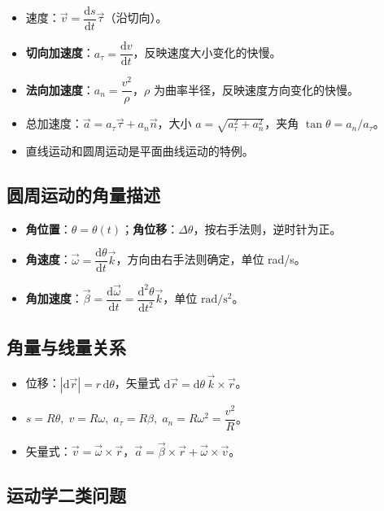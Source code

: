 \documentclass[12pt,a4paper]{ctexart}
\begin{document}
\begin{itemize}
    \item 速度：$\vec{v} = \dfrac{\mathrm{d}s}{\mathrm{d}t}\vec{\tau}$（沿切向）。
    \item \textbf{切向加速度}：$a_\tau = \dfrac{\mathrm{d}v}{\mathrm{d}t}$，反映速度大小变化的快慢。
    \item \textbf{法向加速度}：$a_n = \dfrac{v^2}{\rho}$，$\rho$ 为曲率半径，反映速度方向变化的快慢。
    \item 总加速度：$\vec{a} = a_\tau\vec{\tau} + a_n\vec{n}$，大小 $a = \sqrt{a_\tau^2 + a_n^2}$，夹角 $\tan\theta = a_n/a_\tau$。
    \item 直线运动和圆周运动是平面曲线运动的特例。
\end{itemize}

\subsection{圆周运动的角量描述}

\begin{itemize}
    \item \textbf{角位置}：$\theta = \theta(t)$；\textbf{角位移}：$\Delta\theta$，按右手法则，逆时针为正。
    \item \textbf{角速度}：$\vec{\omega} = \dfrac{\mathrm{d}\theta}{\mathrm{d}t}\vec{k}$，方向由右手法则确定，单位 rad/s。
    \item \textbf{角加速度}：$\vec{\beta} = \dfrac{\mathrm{d}\vec{\omega}}{\mathrm{d}t} = \dfrac{\mathrm{d}^2\theta}{\mathrm{d}t^2}\vec{k}$，单位 $\mathrm{rad}/\mathrm{s}^2$。
\end{itemize}

\subsection{角量与线量关系}

\begin{itemize}
    \item 位移：$|\mathrm{d}\vec{r}| = r\,\mathrm{d}\theta$，矢量式 $\mathrm{d}\vec{r} = \mathrm{d}\theta\,\vec{k}\times\vec{r}$。
    \item $s = R\theta,\; v = R\omega,\; a_\tau = R\beta,\; a_n = R\omega^2 = \dfrac{v^2}{R}$。
    \item 矢量式：$\vec{v} = \vec{\omega}\times\vec{r}$，$\vec{a} = \vec{\beta}\times\vec{r} + \vec{\omega}\times\vec{v}$。
\end{itemize}

\subsection{运动学二类问题}
\end{document}
